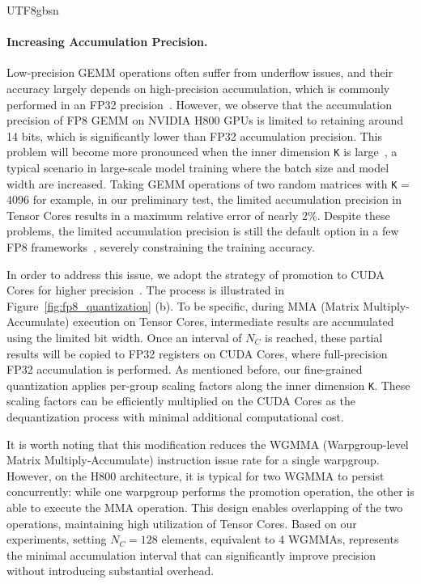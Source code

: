 \documentclass[11pt, a4paper, logo, copyright, nonumbering]{deepseek}
\begin{document}
\begin{CJK*}{UTF8}{gbsn}
\paragraph{Increasing Accumulation Precision.}
Low-precision GEMM operations often suffer from underflow issues, and their accuracy largely depends on high-precision accumulation, which is commonly performed in an FP32 precision~\citep{bf16train, fp16train}.
However, we observe that the accumulation precision of FP8 GEMM on NVIDIA H800 GPUs is limited to retaining around 14 bits, which is significantly lower than FP32 accumulation precision. 
This problem will become more pronounced when the inner dimension \texttt{K} is large~\citep{switchback}, a typical scenario in large-scale model training where the batch size and model width are increased. 
Taking GEMM operations of two random matrices with \texttt{K} = 4096 for example, in our preliminary test, the limited accumulation precision in Tensor Cores results in a maximum relative error of nearly 2\%. 
Despite these problems, the limited accumulation precision is still the default option in a few FP8 frameworks~\citep{transformerengine}, severely constraining the training accuracy. 

In order to address this issue, we adopt the strategy of promotion to CUDA Cores for higher precision~\citep{Thakkar_CUTLASS_2023}. 
The process is illustrated in Figure~\ref{fig:fp8_quantization} (b). 
To be specific, during MMA (Matrix Multiply-Accumulate) execution on Tensor Cores, intermediate results are accumulated using the limited bit width. 
Once an interval of $N_C$ is reached, these partial results will be copied to FP32 registers on CUDA Cores, where full-precision FP32 accumulation is performed.
As mentioned before, our fine-grained quantization applies per-group scaling factors along the inner dimension \texttt{K}. 
These scaling factors can be efficiently multiplied on the CUDA Cores as the dequantization process with minimal additional computational cost.

It is worth noting that this modification reduces the WGMMA (Warpgroup-level Matrix Multiply-Accumulate) instruction issue rate for a single warpgroup. However, on the H800 architecture, it is typical for two WGMMA to persist concurrently: while one warpgroup performs the promotion operation, the other is able to execute the MMA operation. This design enables overlapping of the two operations, maintaining high utilization of Tensor Cores.
Based on our experiments, setting $N_C=128$ elements, equivalent to 4 WGMMAs, represents the minimal accumulation interval that can significantly improve precision without introducing substantial overhead.


\end{CJK*}
\end{document}

